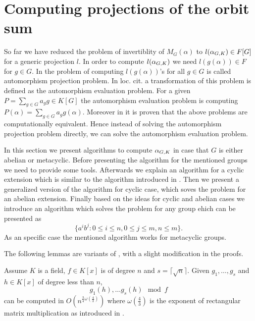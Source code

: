 \section{Computing projections of the orbit sum}\label{sec:osum}

So far we have reduced the problem of invertiblity of $M_G(\alpha)$ to $l(\alpha_{G,K}) \in F[G]$ for a generic
projection $l$. In order to compute $l(\alpha_{G,K})$ we need $l(g(\alpha)) \in F$ for $g \in G$. In \cite{Kaltofen} the problem of
computing $l(g(\alpha))$'s for all $g \in G$ is called automorphism projection problem. In loc. cit. a transformation of this problem
is defined as the automorphism evaluation problem. For a given $P = \sum_{g \in G}a_g g \in K[G]$ the automorphism evaluation problem
is computing $P(\alpha) = \sum_{g \in G}a_g g(\alpha)$. Moreover in \cite{Kaltofen} it is proven that the above problems are
 computationally equivalent. Hence instead of solving the automorphism projection problem directly, we can solve the automorphism
 evaluation problem.

In this section we present algorithms to compute $\alpha_{G,K}$ in case that $G$ is either abelian or metacyclic. 
Before presenting the algorithm for the mentioned groups we need to provide some tools. Afterwards we explain an algorithm
for a cyclic extension which is similar to the algorithm introduced in \cite{Kaltofen}. Then we present a generalized version 
of the algorithm for cyclic case, which soves the problem for an abelian extension. Finally based on the ideas for cyclic and 
abelian cases we introduce an algorithm which solves the problem for any group ehich can be presented as 
$$\lbrace a^ib^j: 0 \leq i \leq n,  0\leq j \leq m, n \leq m \rbrace.$$ 
As an specific case the mentioned algorithm works for metacyclic groups.

The following lemmas are variants of \cite[Lemma 3 $\&$ Lemma 4]{Kaltofen}, with a slight modification in the proofs.

\begin{lemma}\cite{Kaltofen}\label{lem:modcom}
Assume $K$ is a field, $f\in K[x]$ is of degree $n$ and $s = \lceil\sqrt{n}\rceil$. Given $g_1, \ldots , g_{s}$ and 
$h \in K[x]$ of degree less than $n$, $$g_1(h), \ldots g_{s}(h) \mod f$$ can be computed in
$O(n^{\frac{3}{4}\omega(\frac{4}{3})})$ where $\omega(\frac{4}{3})$ is the exponent of rectangular matrix 
multiplication as introduced in \cite{LeGall}. 
\end{lemma}

